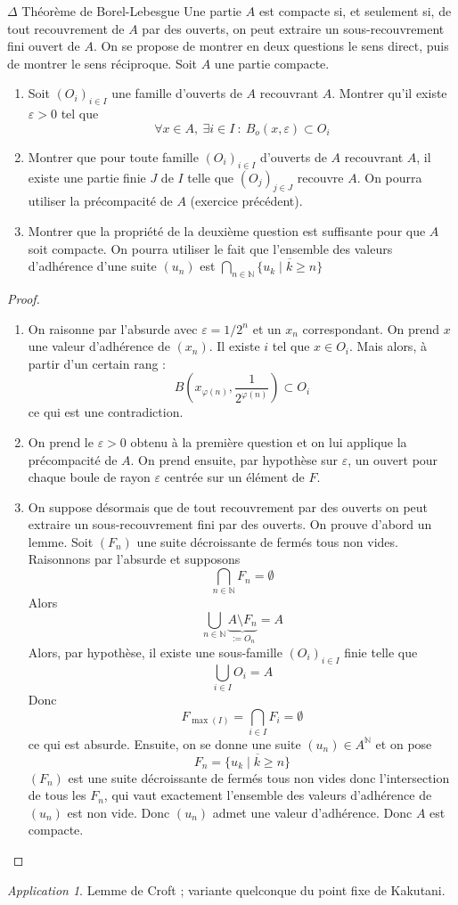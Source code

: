 \documentclass[french,a4paper]{article}
\newcommand{\N}{\mathbb{N}}
\theoremstyle{plain}
\theoremstyle{definition}
\theoremstyle{remark}
\newtheorem*{app}{Application}
\begin{document}
\begin{ex}{$\Delta$ Théorème de Borel-Lebesgue} Une partie $A$ est compacte si, et seulement si, de tout recouvrement de $A$ par des ouverts, on peut extraire un sous-recouvrement fini ouvert de $A$. On se propose de montrer en deux questions le sens direct, puis de montrer le sens réciproque. Soit $A$ une partie compacte.
	\begin{enumerate}
		\item Soit $(O_i)_{i\in I}$ une famille d'ouverts de $A$ recouvrant $A$. Montrer qu'il existe $\varepsilon>0$ tel que $$\forall x\in A,\ \exists i\in I\ : \ B_o(x,\varepsilon)\subset O_i$$
		\item Montrer que pour toute famille $(O_i)_{i\in I}$ d'ouverts de $A$ recouvrant $A$, il existe une partie finie $J$ de $I$ telle que $(O_j)_{j\in J}$ recouvre $A$. On pourra utiliser la précompacité de $A$ (exercice précédent).
		\item Montrer que la propriété de la deuxième question est suffisante pour que $A$ soit compacte. On pourra utiliser le fait que l'ensemble des valeurs d'adhérence d'une suite $(u_n)$ est $\displaystyle\bigcap_{n\in\N}\overline{\{u_k\mid k\geqslant n\}}$
	\end{enumerate}
\end{ex}
\begin{proof}
	\begin{enumerate}
		\item On raisonne par l'absurde avec $\varepsilon=1/2^n$ et un $x_n$ correspondant. On prend $x$ une valeur d'adhérence de $(x_n)$. Il existe $i$ tel que $x\in O_i$. Mais alors, à partir d'un certain rang : $$B\left(x_{\varphi(n)},\frac{1}{2^{\varphi(n)}}\right)\subset O_i$$ ce qui est une contradiction.
		\item On prend le $\varepsilon>0$ obtenu à la première question et on lui applique la précompacité de $A$. On prend ensuite, par hypothèse sur $\varepsilon$, un ouvert pour chaque boule de rayon $\varepsilon$ centrée sur un élément de $F$.
		\item On suppose désormais que de tout recouvrement par des ouverts on peut extraire un sous-recouvrement fini par des ouverts. On prouve d'abord un lemme. Soit $(F_n)$ une suite décroissante de fermés tous non vides. Raisonnons par l'absurde et supposons $$\bigcap_{n\in\N} F_n=\emptyset$$ Alors $$\bigcup_{n\in\N}\underbrace{A\setminus F_n}_{:=O_n}=A$$ Alors, par hypothèse, il existe une sous-famille $(O_i)_{i\in I}$ finie telle que $$\bigcup_{i\in I}O_i=A$$ Donc $$F_{\max(I)}=\bigcap_{i\in I}F_i=\emptyset$$ ce qui est absurde. Ensuite, on se donne une suite $(u_n)\in A^\N$ et on pose $$F_n=\overline{\{u_k\mid k\geqslant n\}}$$ $(F_n)$ est une suite décroissante de fermés tous non vides donc l'intersection de tous les $F_n$, qui vaut exactement l'ensemble des valeurs d'adhérence de $(u_n)$ est non vide. Donc $(u_n)$ admet une valeur d'adhérence. Donc $A$ est compacte.
	\end{enumerate}
\end{proof}
\begin{app}
	Lemme de Croft ; variante quelconque du point fixe de Kakutani.
\end{app}
\end{document}
